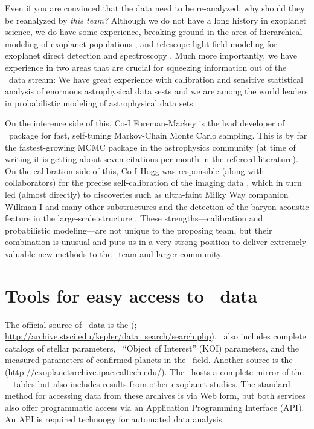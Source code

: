\documentclass[letterpaper,12pt,preprint]{hack_aastex}
\newcommand{\hurl}[1]{{\scriptsize\url{#1}}}
\newcommand{\emcee}{\package{emcee}}
\begin{document}
Even if you are convinced that the data need to be re-analyzed, why
should they be reanalyzed by \emph{this team?}  Although we do not
have a long history in exoplanet science, we do have some experience,
breaking ground in the area of hierarchical modeling of exoplanet
populations \citep{hogg-ecc}, and telescope light-field modeling for
exoplanet direct detection and spectroscopy \citep{opp}.  Much
more importantly, we have experience in two
areas that are crucial for squeezing information out
of the \Kepler\ data stream: We have great experience with calibration
and sensitive statistical analysis of enormous astrophysical data
sests and we are among the world leaders in
probabilistic modeling of astrophysical data sets.

On the inference side of this,
Co-I Foreman-Mackey is the lead developer of \emcee\
package \citep{emcee} for fast, self-tuning Markov-Chain Monte Carlo sampling.
This is by far the fastest-growing MCMC package in the astrophysics community
 (at time of writing it is getting about seven citations per month in the
refereed literature).
On the calibration side of this,
Co-I Hogg was responsible (along with collaborators) for
the precise self-calibration of the 
imaging data \citep{ubercal}, which in turn led (almost directly)
to discoveries such as ultra-faint Milky Way companion Willman I
 \citep{wil1} and many other substructures \citep[for example,][]{wil2, field, gd1} and the detection of the baryon acoustic feature
in the large-scale structure \citep{bao}.  These
strengths---calibration and probabilistic modeling---are not unique to
the proposing team, but their combination is unusual and puts us in a
very strong position to deliver extremely valuable new methods to the
\Kepler\ team and larger community.

\section{Tools for easy access to \Kepler\ data}

The official source of \Kepler\ data is the
(\MAST; \hurl{http://archive.stsci.edu/kepler/data\_search/search.php}).
\MAST\ also includes complete catalogs of stellar parameters, \Kepler\
``Object of Interest'' (KOI) parameters, and the measured parameters of
confirmed planets in the \Kepler\ field.
Another source is the
 (\hurl{http://exoplanetarchive.ipac.caltech.edu/}).
The \EA\ hosts a complete mirror of the \MAST\ \Kepler\ tables but
also includes results from other exoplanet studies.
The standard method for accessing data from these archives is via Web
form,
but both services also offer programmatic access via an Application
Programming Interface (API).
An API is required technoogy for automated data analysis.
\end{document}
